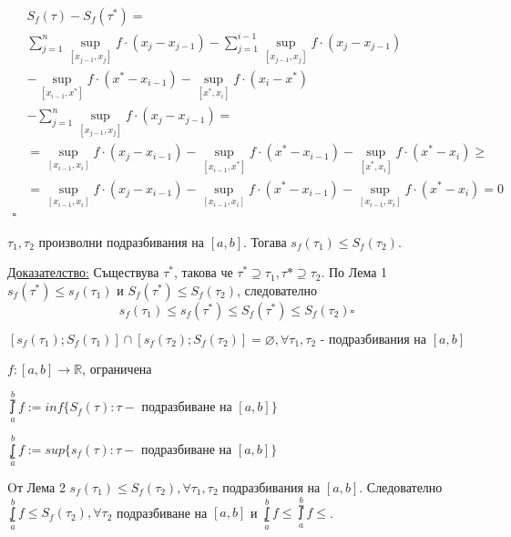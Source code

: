 \documentclass{article}
\newcommand{\tvurdenie}[2]{
    \begin{tcolorbox}[title = #1 ,colframe = blue!70!black, colback = blue!10!white]
        #2
    \end{tcolorbox}
}
\begin{document}
\begin{equation*}
\begin{split}
                & S_f(\tau)-S_f(\tau^*) = \\
                & \sum_{j=1}^{n}\sup_{[x_{j-1},x_j]}f \cdot (x_j-x_{j-1}) -
                \sum_{j=1}^{i-1}\sup_{[x_{j-1},x_j]}f \cdot (x_j-x_{j-1}) \\
                & - \sup_{[x_{i-1},x^*]}f \cdot (x^*-x_{i-1}) -
                \sup_{[x^*,x_i]}f \cdot (x_i-x^*) \\
                & - \sum_{j=1}^{n}\sup_{[x_{j-1},x_j]}f \cdot (x_j-x_{j-1}) =\\
                & = 
                \sup_{[x_{i-1},x_i]}f \cdot (x_j-x_{i-1})
                - \sup_{[x_{i-1}, x^*]}f \cdot (x^*-x_{i-1}) 
                - \sup_{[x^*,x_i]}f \cdot (x^*-x_i) \ge \\
                & = 
                \sup_{[x_{i-1},x_i]}f \cdot (x_j-x_{i-1})
                - \sup_{[x_{i-1}, x_i]}f \cdot (x^*-x_{i-1}) 
                - \sup_{[x_{i-1},x_i]}f \cdot (x^*-x_i) = 0 \\
                \square
\end{split}
\end{equation*}

\tvurdenie{Лема 2}{
    $\tau_1, \tau_2$ произволни подразбивания на $[a,b]$.
    Тогава $s_f(\tau_1)\leq S_f(\tau_2)$.
}
\underline{Доказателство:} Съществува $\tau^*$, такова че $\tau^*\supseteq \tau_1, \tau*\supseteq \tau_2$.
По Лема 1 $s_f(\tau^*)\leq s_f(\tau_1)$ и $S_f(\tau^*)\leq S_f(\tau_2)$, следователно
\[
    s_f(\tau_1)\leq s_f(\tau^*) \leq S_f(\tau^*) \leq S_f(\tau_2)\square
\]

\[
    [s_f(\tau_1);S_f(\tau_1)]\cap [s_f(\tau_2);S_f(\tau_2)]=\varnothing, \forall\tau_1,\tau_2 \text{ - подразбивания на }[a,b]
\]

$f:[a,b]\rightarrow\mathbb{R}$, ограничена

$\upint\limits_{a}^{b} f := inf\{S_f(\tau): \tau - \text{ подразбиване на }[a,b]\}$

$\lowint\limits_{a}^{b} f := sup\{s_f(\tau): \tau - \text{ подразбиване на }[a,b]\}$

Oт Лема 2 $s_f(\tau_1)\leq S_f(\tau_2), \forall \tau_1,\tau_2$ подразбивания на $[a,b]$. Следователно
$\lowint\limits_{a}^{b} f \leq S_f(\tau_2), \forall \tau_2$ подразбиване на $[a,b]$ и $\lowint\limits_{a}^{b} f \leq \upint\limits_{a}^{b} f \leq$.
\end{document}
